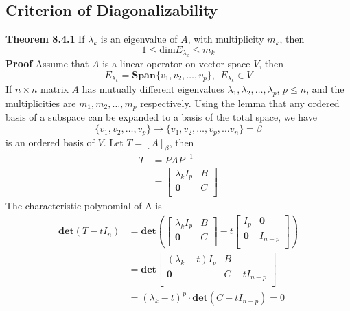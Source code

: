 \documentclass[11pt]{article}
\begin{document}
\subsection{Criterion of Diagonalizability}
\noindent \textbf{Theorem 8.4.1} If $\lambda_{k}$ is an eigenvalue of $A$, with multiplicity $m_{k}$, then 
\begin{equation}
    1 \leq \text{dim}E_{\lambda_{k}} \leq m_{k}
\end{equation}
\textbf{Proof} Assume that $A$ is a linear operator on vector space $V$, then
\begin{equation}
    E_{\lambda_{k}} = \bm{Span}\{v_1,v_2,\dots,v_{p}\},~~E_{\lambda_{k}} \in V
\end{equation}
If $n \times n$ matrix $A$ has mutually different eigenvalues $\lambda_1, \lambda_2,\dots,\lambda_p$, $p\leq n$, and the multiplicities are $m_{1},m_2,\dots,m_p$ respectively.
Using the lemma that any ordered basis of a subspace can be expanded to a basis of the total space, we have
\begin{equation}
    \{v_1,v_2,\dots,v_{p}\} \rightarrow \{v_1,v_2,\dots,v_{p}, \dots v_{n}\} = \beta
\end{equation}
is an ordered basis of $V$. Let $T = [A]_{\beta}$, then
\begin{equation}
\begin{aligned}
    T &= PAP^{-1} \\
    &= \begin{bmatrix}
    \lambda_{k}I_{p} & B \\
    \bm{0} & C \\
    \end{bmatrix}
\end{aligned}
\end{equation}
The characteristic polynomial of A is
\begin{equation}
\begin{aligned}
    \bm{det}(T-tI_n) &= \bm{det}\left(\begin{bmatrix}
    \lambda_{k}I_{p} & B \\
    \bm{0} & C \\
    \end{bmatrix} - t\begin{bmatrix}
    I_{p} & \bm{0} \\ \bm{0} & I_{n-p} \\
    \end{bmatrix}\right) \\
    &= \bm{det}\begin{bmatrix}
    (\lambda_{k}-t)I_p & B \\
    \bm{0} & C-tI_{n-p} \\
    \end{bmatrix} \\
    &= (\lambda_k - t)^{p}\cdot\bm{det}(C-tI_{n-p}) = 0
\end{aligned}
\end{equation}
\end{document}

